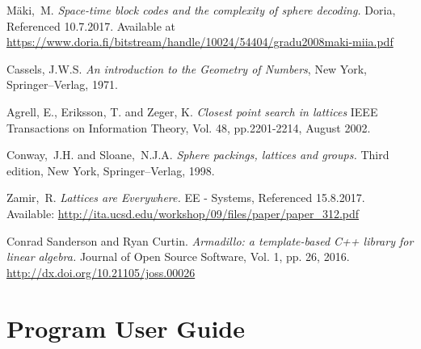 \documentclass[english,12pt,a4paper,pdftex,sci,utf8]{aaltothesis}
\begin{document}
{}
\begin{thebibliography}{99}

 Mäki,\ M. \textit{Space-time block codes and the complexity of sphere decoding.} Doria, Referenced 10.7.2017. Available at
  \url{https://www.doria.fi/bitstream/handle/10024/54404/gradu2008maki-miia.pdf}
   
 Cassels, J.W.S. \textit{An introduction to the Geometry of Numbers}, New York, Springer--Verlag, 1971.

 Agrell, E., Eriksson, T. and Zeger, K. \textit{Closest point search in lattices} IEEE Transactions on Information Theory, Vol. 48, pp.2201-2214,
August 2002.

 Conway,\ J.H. and Sloane,\ N.J.A. \textit{Sphere packings, lattices and groups.} Third edition, New York, Springer--Verlag, 1998.

 Zamir,\ R. \textit{Lattices are Everywhere.} EE - Systems, Referenced 15.8.2017. Available: \url{http://ita.ucsd.edu/workshop/09/files/paper/paper_312.pdf}

 Conrad Sanderson and Ryan Curtin.
\textit{Armadillo: a template-based C++ library for linear algebra.}
Journal of Open Source Software, Vol. 1, pp. 26, 2016.
\url{http://dx.doi.org/10.21105/joss.00026}



\end{thebibliography}

\clearpage

\thesisappendix

\section{Program User Guide}

\end{document}
